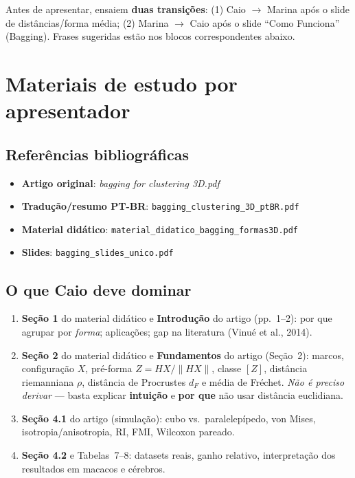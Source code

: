 \documentclass[12pt,a4paper]{article}
\begin{document}
\begin{dica}
Antes de apresentar, ensaiem \textbf{duas transições}:
(1) Caio $\rightarrow$ Marina após o slide de distâncias/forma média;
(2) Marina $\rightarrow$ Caio após o slide ``Como Funciona'' (Bagging).
Frases sugeridas estão nos blocos correspondentes abaixo.
\end{dica}

\section{Materiais de estudo por apresentador}

\subsection{Referências bibliográficas}

\begin{itemize}[leftmargin=*]
  \item \textbf{Artigo original}: \textit{bagging for clustering 3D.pdf}
  \item \textbf{Tradução/resumo PT-BR}: \texttt{bagging\_clustering\_3D\_ptBR.pdf}
  \item \textbf{Material didático}: \texttt{material\_didatico\_bagging\_formas3D.pdf}
  \item \textbf{Slides}: \texttt{bagging\_slides\_unico.pdf}
\end{itemize}

\subsection{O que Caio deve dominar}

\begin{blococaio}
\begin{enumerate}[leftmargin=*]
  \item \textbf{Seção 1} do material didático e \textbf{Introdução} do artigo (pp.\ 1--2):
        por que agrupar por \emph{forma}; aplicações; gap na literatura (Vinué et al., 2014).
  \item \textbf{Seção 2} do material didático e \textbf{Fundamentos} do artigo (Seção~2):
        marcos, configuração $X$, pré-forma $Z = HX/\|HX\|$, classe $[Z]$,
        distância riemanniana $\rho$, distância de Procrustes $d_F$ e média de Fréchet.
        \emph{Não é preciso derivar} --- basta explicar \textbf{intuição} e \textbf{por que}
        não usar distância euclidiana.
  \item \textbf{Seção 4.1} do artigo (simulação): cubo vs.\ paralelepípedo, von Mises,
        isotropia/anisotropia, RI, FMI, Wilcoxon pareado.
  \item \textbf{Seção 4.2} e Tabelas~7--8: datasets reais, ganho relativo, interpretação
        dos resultados em macacos e cérebros.
\end{enumerate}
\end{blococaio}
\end{document}
